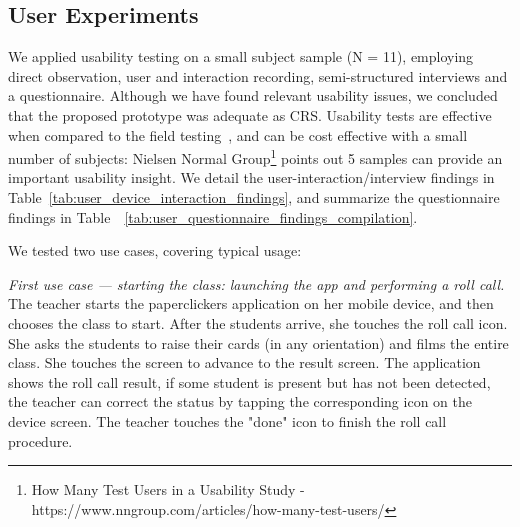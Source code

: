 \subsection{User Experiments}


We applied usability testing on a small subject sample (N = 11), employing direct observation, user and interaction recording, semi-structured interviews and a questionnaire. Although we have found relevant usability issues, we concluded that the proposed prototype was adequate as CRS. Usability tests are effective when compared to the field testing~\cite{kaikkonen2005usabilitytests}, and can be cost effective with a small number of subjects: Nielsen Normal Group\footnote{How Many Test Users in a Usability Study - https://www.nngroup.com/articles/how-many-test-users/} points out 5 samples can provide an important usability insight. We detail the user-interaction/interview findings in Table~\ref{tab:user_device_interaction_findings}, and summarize the questionnaire findings in Table~~\ref{tab:user_questionnaire_findings_compilation}.





We tested two use cases, covering typical usage:

\textit{First use case --- starting the class: launching the app and performing a roll call.} The teacher starts the paperclickers application on her mobile device, and then chooses the class to start. After the students arrive, she touches the roll call icon. She asks the students to raise their cards (in any orientation) and films the entire class. She touches the screen to advance to the result screen. The application shows the roll call result, if some student is present but has not been detected, the teacher can correct the status by tapping the corresponding icon on the device screen. The teacher touches the "done" icon to finish the roll call procedure.

